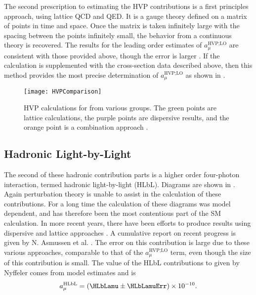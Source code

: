 The second prescription to estimating the HVP contributions is a first principles approach, using lattice QCD and QED. It is a gauge theory defined on a matrix of points in time and space. Once the matrix is taken infinitely large with the spacing between the points infinitely small, the behavior from a continuous theory is recovered. The results for the leading order estimates of $a_{\mu}^{\text{HVP;LO}}$ are consistent with those provided above, though the error is larger \cite{Lattice}. If the calculation is supplemented with the cross-section data described above, then this method provides the most precise determination of $a_{\mu}^{\text{HVP;LO}}$ as shown in .

\begin{figure}[]
    \centering
    \texttt{[image: HVPComparison]}
    \caption[HVP calculations for \amu from various groups]{HVP calculations for \amu from various groups. The green points are lattice calculations, the purple points are dispersive results, and the orange point is a combination approach \cite{Lattice}.}
    \label{fig:HVPComparison}
\end{figure}


\subsection*{Hadronic Light-by-Light}
\label{subsec:HLbL}

The second of these hadronic contribution parts is a higher order four-photon interaction, termed hadronic light-by-light (HLbL). Diagrams are shown in . Again perturbation theory is unable to assist in the calculation of these contributions. For a long time the calculation of these diagrams was model dependent, and has therefore been the most contentious part of the SM calculation. In more recent years, there have been efforts to produce results using dispersive \cite{Colangelo:2014dfa,Colangelo:2015ama,Colangelo:2017qdm} and lattice approaches \cite{Blum:2015gfa,Blum:2016lnc,Blum:2017cer}. A cumulative report on recent progress is given by N. Asmussen et al. \cite{HLbL1}. The error on this contribution is large due to these various approaches, comparable to that of the $a_{\mu}^{\text{HVP;LO}}$ term, even though the size of this contribution is small. The value of the HLbL contributions to \amu given by Nyffeler \cite{Nyffeler:2016gnb} comes from model estimates and is 
		\begin{align}
            a_{\mu}^{\text{HLbL}} = (\HLbLamu \pm \HLbLamuErr) \times 10^{-10}.
		\end{align}


